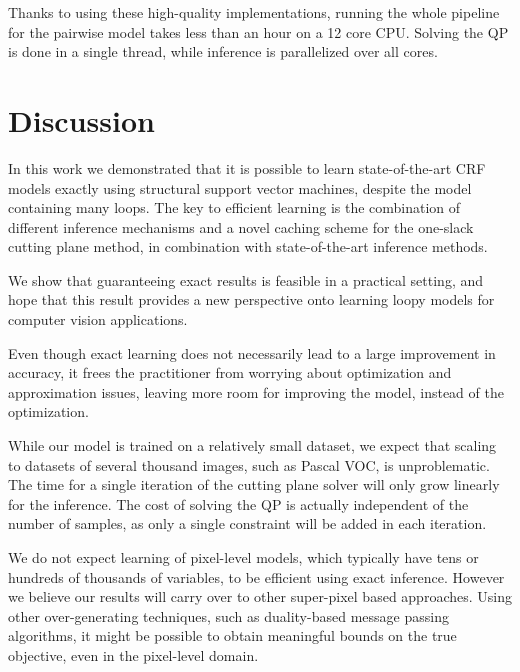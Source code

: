 Thanks to using these high-quality implementations, running the whole pipeline
for the pairwise model takes less than an hour on a 12 core CPU\@. Solving the
QP is done in a single thread, while inference is parallelized over all cores.
 
\section{Discussion}
In this work we demonstrated that it is possible to learn state-of-the-art CRF models
exactly using structural support vector machines, despite the model containing many loops.
The key to efficient learning is the combination of different inference mechanisms and
a novel caching scheme for the one-slack cutting plane method, in combination
with state-of-the-art inference methods.

We show that guaranteeing exact results is feasible in a practical setting, and
hope that this result provides a new perspective onto learning loopy models for
computer vision applications.

Even though exact learning does not necessarily lead to a large improvement in
accuracy, it frees the practitioner from worrying about optimization and
approximation issues, leaving more room for improving the model, instead of the
optimization.

While our model is trained on a relatively small dataset, we expect that scaling to
datasets of several thousand images, such as Pascal VOC, is unproblematic.
The time for a single iteration of the cutting plane solver will only grow
linearly for the inference. The cost of solving the QP is actually independent
of the number of samples, as only a single constraint will be added in each
iteration.

We do not expect learning of pixel-level models, which typically have tens or
hundreds of thousands of variables, to be efficient using exact inference. However we
believe our results will carry over to other super-pixel based approaches.
Using other over-generating techniques, such as duality-based message passing
algorithms, it might be possible to obtain meaningful bounds on the true
objective, even in the pixel-level domain.

